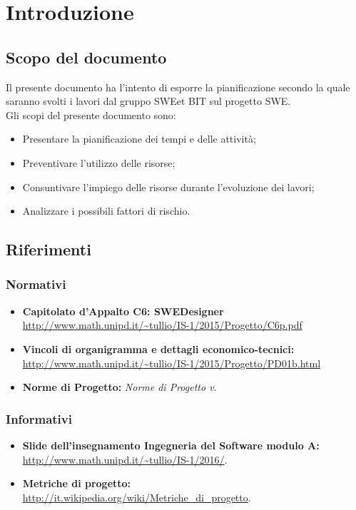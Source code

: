 \section{Introduzione}
\subsection{Scopo del documento}
Il presente documento ha l'intento di esporre la pianificazione secondo la quale saranno svolti i lavori dal gruppo SWEet BIT sul progetto SWE. \\
Gli scopi del presente documento sono: \\
\begin{itemize}
	\item Presentare la pianificazione dei tempi e delle attività;
	\item Preventivare l'utilizzo delle risorse;
	\item Consuntivare l'impiego delle risorse durante l'evoluzione dei lavori;
	\item Analizzare i possibili fattori di rischio. \\
\end{itemize}
\subsection{Riferimenti}
\subsubsection{Normativi}
\begin{itemize}
	\item \textbf{Capitolato d'Appalto C6: SWEDesigner} \\
		\url{http://www.math.unipd.it/~tullio/IS-1/2015/Progetto/C6p.pdf} \\
	\item \textbf{Vincoli di organigramma e dettagli economico-tecnici:} \\
		\url{http://www.math.unipd.it/~tullio/IS-1/2015/Progetto/PD01b.html} \\
	\item \textbf{Norme di Progetto:} \textit{Norme di Progetto v\VersioneNP}. \\
\end{itemize}
\subsubsection{Informativi}
\begin{itemize}
	\item \textbf{Slide dell'insegnamento Ingegneria del Software modulo A:} \\
		\url{http://www.math.unipd.it/~tullio/IS-1/2016/}. \\
	\item \textbf{Metriche di progetto:} \\
		\url{http://it.wikipedia.org/wiki/Metriche_di_progetto}. \\
\end{itemize}
